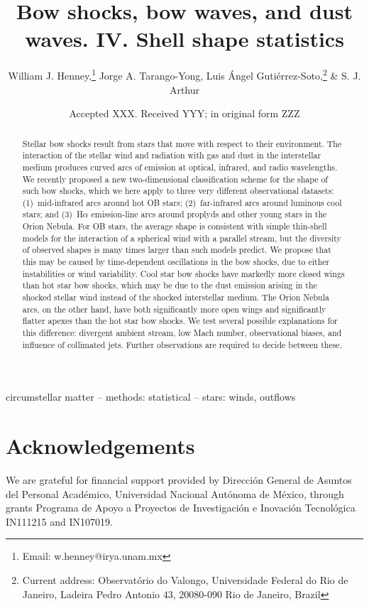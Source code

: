 \documentclass[useAMS, usenatbib, a4paper]{mnras}
\title[Bow shocks, bow waves, and dust waves. IV.]{Bow shocks, bow
  waves, and dust waves. IV. Shell shape statistics}
\author[Henney et al.]{
  William J. Henney,\thanks{Email: w.henney@irya.unam.mx}
  Jorge A. Tarango-Yong,
  Luis \'Angel Guti\'errez-Soto,\thanks{%
    Current address: Observatório do Valongo,
    Universidade Federal do Rio de Janeiro,
    Ladeira Pedro Antonio 43, 20080-090 Rio de Janeiro, Brazil}
  \& S. J. Arthur
  \\
  \AddressCRyA
}
\date{Accepted XXX. Received YYY; in original form ZZZ}
\begin{document}
\label{firstpage}
\pagerange{\pageref{firstpage}--\pageref{lastpage}}
\maketitle
\begin{abstract}
  Stellar bow shocks result from stars that move with respect to their
  environment. The interaction of the stellar wind and radiation with
  gas and dust in the interstellar medium produces curved arcs of
  emission at optical, infrared, and radio wavelengths.  We recently
  proposed a new two-dimensional classification scheme for the shape
  of such bow shocks, which we here apply to three very different
  observational datasets: (1)~mid-infrared arcs around hot OB stars;
  (2)~far-infrared arcs around luminous cool stars; and
  (3)~H\(\alpha\) emission-line arcs around proplyds and other young stars
  in the Orion Nebula.  For OB stars, the average shape is consistent
  with simple thin-shell models for the interaction of a spherical
  wind with a parallel stream, but the diversity of observed shapes is
  many times larger than such models predict.  We propose that this
  may be caused by time-dependent oscillations in the bow shocks, due
  to either instabilities or wind variability.  Cool star bow shocks
  have markedly more closed wings than hot star bow shocks, which may
  be due to the dust emission arising in the shocked stellar wind
  instead of the shocked interstellar medium.  The Orion Nebula arcs,
  on the other hand, have both significantly more open wings and
  significantly flatter apexes than the hot star bow shocks.  We test
  several possible explanations for this difference: divergent ambient
  stream, low Mach number, observational biases, and influence of
  collimated jets.  Further observations are required to decide
  between these.
\end{abstract}

\begin{keywords}
  circumstellar matter -- methods: statistical -- stars: winds, outflows
\end{keywords}






\section*{Acknowledgements}
We are grateful for financial support provided by Dirección General de
Asuntos del Personal Académico, Universidad Nacional Autónoma de
México, through grants Programa de Apoyo a Proyectos de Investigación
e Inovación Tecnológica IN111215 and IN107019.  



\appendix



\bsp	%
\label{lastpage}
\end{document}
